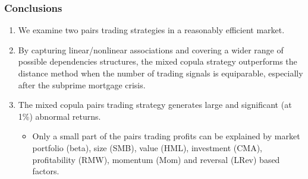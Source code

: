 \documentclass[pdf,10pt,xcolor=dvipsnames,hide notes]{beamer}
\begin{document}
\begin{frame}[label=frame5b2]
\frametitle{Conclusions}


\begin{enumerate}
	\justifying
	
	\item<1> We examine two pairs trading strategies in a reasonably efficient market.
	
	\pause
	\vspace{0.3cm}
	
	\item<2> By capturing linear/nonlinear associations and covering a wider range of possible dependencies structures, the mixed copula strategy outperforms the distance method when the number of trading signals is equiparable, especially after the subprime mortgage crisis.
	
	\pause
	\vspace{0.3cm}
	
	\item<3> The mixed copula pairs trading strategy generates large and significant (at 1\%) abnormal returns.
	
		\begin{itemize}
			\item<3> Only a small part of the pairs trading profits can be explained by market portfolio (beta), size (SMB), value (HML), investment (CMA), profitability (RMW), momentum (Mom) and reversal (LRev) based factors.
		\end{itemize}
	
\end{enumerate}

\end{frame}
\end{document}
